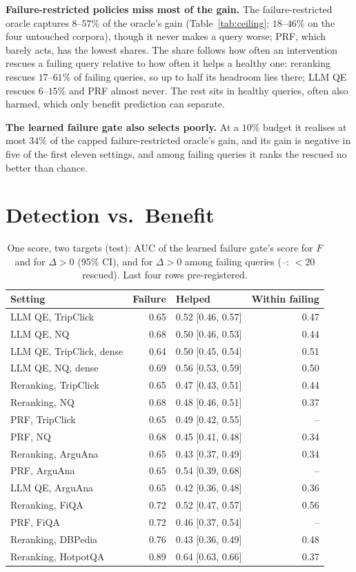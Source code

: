 \documentclass[sigconf,anonymous,review]{acmart}
\begin{document}
\textbf{Failure-restricted policies miss most of the gain.} The
failure-restricted oracle captures $8$--$57\%$ of the oracle's gain
(Table~\ref{tab:ceiling}; $18$--$46\%$ on the four untouched corpora), though it
never makes a query worse; PRF, which barely acts, has the lowest
shares. The share follows how often an
intervention rescues a failing query relative to how often it helps a
healthy one: reranking rescues $17$--$61\%$ of failing queries, so up
to half its headroom lies there; LLM QE rescues $6$--$15\%$ and PRF
almost never. The rest sits in healthy queries, often also harmed,
which only benefit prediction can separate.

\textbf{The learned failure gate also selects poorly.} At a $10\%$
budget it realises at most $34\%$ of the capped failure-restricted
oracle's gain, and its gain is negative in five of the first eleven
settings, and among failing queries it ranks the rescued no better
than chance.


\section{Detection vs.\ Benefit}
\label{sec:auc}



\begin{table}[t]
\caption{One score, two targets (test): AUC of the learned failure
gate's score for $F$ and for $\Delta>0$ (95\% CI), and for $\Delta>0$
among failing queries (--: $<20$ rescued). Last four rows
pre-registered.}
\label{tab:auc}
\footnotesize
\setlength{\tabcolsep}{3pt}
\begin{tabular}{@{}lrlr@{}}
\toprule
Setting & Failure & Helped & Within failing \\
\midrule
LLM QE, TripClick & 0.65 & 0.52 [0.46, 0.57] & 0.47 \\
LLM QE, NQ & 0.68 & 0.50 [0.46, 0.53] & 0.44 \\
LLM QE, TripClick, dense & 0.64 & 0.50 [0.45, 0.54] & 0.51 \\
LLM QE, NQ, dense & 0.69 & 0.56 [0.53, 0.59] & 0.50 \\
Reranking, TripClick & 0.65 & 0.47 [0.43, 0.51] & 0.44 \\
Reranking, NQ & 0.68 & 0.48 [0.46, 0.51] & 0.37 \\
PRF, TripClick & 0.65 & 0.49 [0.42, 0.55] & -- \\
PRF, NQ & 0.68 & 0.45 [0.41, 0.48] & 0.34 \\
\midrule
Reranking, ArguAna & 0.65 & 0.43 [0.37, 0.49] & 0.34 \\
PRF, ArguAna & 0.65 & 0.54 [0.39, 0.68] & -- \\
LLM QE, ArguAna & 0.65 & 0.42 [0.36, 0.48] & 0.36 \\
\midrule
Reranking, FiQA & 0.72 & 0.52 [0.47, 0.57] & 0.56 \\
PRF, FiQA & 0.72 & 0.46 [0.37, 0.54] & -- \\
Reranking, DBPedia & 0.76 & 0.43 [0.36, 0.49] & 0.48 \\
Reranking, HotpotQA & 0.89 & 0.64 [0.63, 0.66] & 0.37 \\
\bottomrule
\end{tabular}
\end{table}
\end{document}

